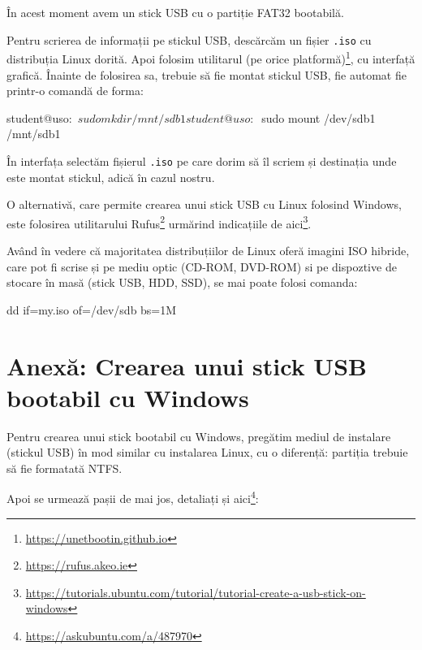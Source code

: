 În acest moment avem un stick USB cu o partiție FAT32 bootabilă.

Pentru scrierea de informații pe stickul USB, descărcăm un fișier \texttt{.iso}
cu distribuția
Linux dorită. Apoi folosim utilitarul  (pe orice
platformă)\footnote{\url{https://unetbootin.github.io}}, cu interfață grafică.
Înainte de folosirea sa, trebuie să fie montat stickul USB, fie automat fie
printr-o comandă de forma:

\begin{screen}
student@uso:~$ sudo mkdir /mnt/sdb1
student@uso:~$ sudo mount /dev/sdb1 /mnt/sdb1
\end{screen}

În interfața  selectăm fișierul \texttt{.iso} pe care dorim să îl scriem și
destinația unde este montat stickul, adică  în cazul nostru.

O alternativă, care permite crearea unui stick USB cu Linux folosind Windows,
este folosirea utilitarului Rufus\footnote{\url{https://rufus.akeo.ie}} urmărind
indicațiile de
aici\footnote{\url{https://tutorials.ubuntu.com/tutorial/tutorial-create-a-usb-stick-on-windows}}.

Având în vedere că majoritatea distribuțiilor de Linux oferă imagini ISO hibride, care pot fi scrise
și pe mediu optic (CD-ROM, DVD-ROM) si pe dispoztive de stocare în masă (stick USB, HDD, SSD), se mai poate folosi comanda:
\begin{screen}
	dd if=my.iso of=/dev/sdb bs=1M
\end{screen}

\section{Anexă: Crearea unui stick USB bootabil cu Windows}
\label{sec:boot:usb-windows}

Pentru crearea unui stick bootabil cu Windows, pregătim mediul de instalare
(stickul USB) în mod similar cu instalarea Linux, cu o diferență: partiția
trebuie să fie formatată NTFS.

Apoi se urmează pașii de mai jos, detaliați și
aici\footnote{\url{https://askubuntu.com/a/487970}}:

